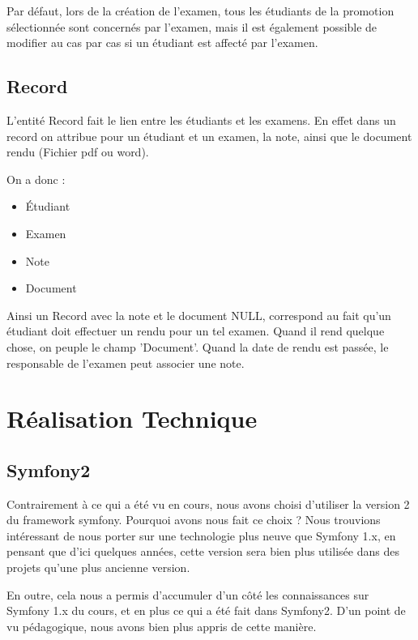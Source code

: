 \documentclass{report}
\begin{document}
			Par défaut, lors de la création de l'examen, tous les étudiants de la 
      promotion sélectionnée sont concernés par l'examen, mais il est également 
      possible de modifier au cas par cas si un étudiant est affecté par l'examen.
      
    \section{Record}
			L'entité Record fait le lien entre les étudiants et les examens. En effet
      dans un record on attribue pour un étudiant et un examen, la note, ainsi
      que le document rendu (Fichier pdf ou word).

			On a donc :
			\begin{itemize}
				\item{Étudiant}
				\item{Examen}
				\item{Note}
				\item{Document}
      \end{itemize}\vspace{1em}

			Ainsi un Record avec la note et le document NULL, correspond au fait qu'un
      étudiant doit effectuer un rendu pour un tel examen. Quand il rend quelque
      chose, on peuple le champ 'Document'. Quand la date de rendu est passée,
      le responsable de l'examen peut associer une note.

  \clearpage
  \chapter{Réalisation Technique}
    \section{Symfony2}
      Contrairement à ce qui a été vu en cours, nous avons choisi d'utiliser la 
      version 2 du framework symfony. Pourquoi avons nous fait ce choix ? Nous 
      trouvions intéressant de nous porter sur une technologie plus neuve que 
      Symfony 1.x, en pensant que d'ici quelques années, cette version sera bien
      plus utilisée dans des projets qu'une plus ancienne version.
      
      En outre, cela nous a permis d'accumuler d'un côté les connaissances sur
      Symfony 1.x du cours, et en plus ce qui a été fait dans Symfony2. D'un point de vu 
      pédagogique, nous avons bien plus appris de cette manière.
      
\end{document}
